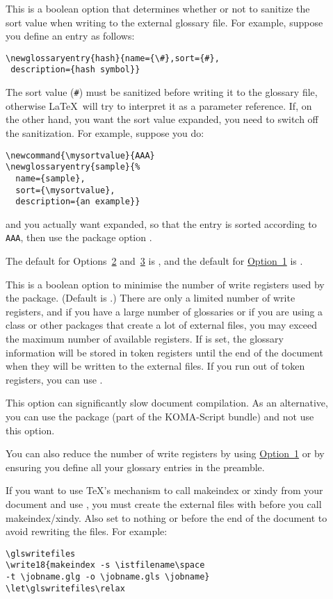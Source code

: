 \documentclass[report,inlinetitle]{nlctdoc}
\newcommand*{\opt}[1]{\hyperlink{option#1}{Option~#1}}
\newcommand*{\optsand}[2]{Options~\hyperlink{option#1}{#1}
and~\hyperlink{option#2}{#2}}
\newcounter{sample}
\begin{document}
\begin{description}
\item[] This is a boolean option that
determines whether or not to \gls{sanitize} the sort value when
writing to the external glossary file. For example, suppose you
define an entry as follows:
\begin{verbatim}
\newglossaryentry{hash}{name={\#},sort={#},
 description={hash symbol}}
\end{verbatim}
The sort value (\verb|#|) must be sanitized before writing it to the
glossary file, otherwise \LaTeX\ will try to interpret it as a
parameter reference. If, on the other hand, you want the sort value
expanded, you need to switch off the sanitization. For example,
suppose you do:
\begin{verbatim}
\newcommand{\mysortvalue}{AAA}
\newglossaryentry{sample}{%
  name={sample},
  sort={\mysortvalue},
  description={an example}}
\end{verbatim}
and you actually want  expanded, so that the entry
is sorted according to \texttt{AAA}, then use the package option
.

The default for \optsand23 is , and the
default for \opt1 is .

\item[] This is a boolean option to minimise the
number of write registers used by the  package.
(Default is .) There are only a limited
number of write registers, and if you have a large number of
glossaries or if you are using a class or other packages that
create a lot of external files, you may exceed the maximum number
of available registers. If  is set, the glossary
information will be stored in token registers until the end of the
document when they will be written to the external files. If you run
out of token registers, you can use .

\begin{important}
This option can significantly slow document compilation. As an
alternative, you can use the  package (part of the
KOMA-Script bundle) and not use this option.
\end{important}

You can also reduce the number of write registers by using
\opt1 or by ensuring you define all your glossary entries in the
preamble.

\begin{important}
If you want to use \TeX's  mechanism to call
\gls{makeindex} or \gls{xindy} from your document and use
, you must create the external files with 
 before you call \gls*{makeindex}/\gls*{xindy}. Also set
 to nothing or  before the end of the
document to avoid rewriting the files. For example:
\begin{verbatim}
\glswritefiles
\write18{makeindex -s \istfilename\space 
-t \jobname.glg -o \jobname.gls \jobname}
\let\glswritefiles\relax
\end{verbatim}
\end{important}


\end{description}
\end{document}
